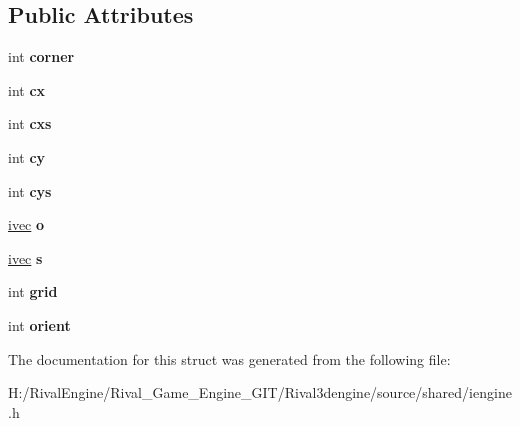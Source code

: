 \subsection*{Public Attributes}
\begin{DoxyCompactItemize}
\item 
\mbox{\label{structselinfo_a85f57916f8cf73dd960665b30b6187b2}} 
int {\bfseries corner}
\item 
\mbox{\label{structselinfo_a4a050e4b02c6c71339578e1061ffe665}} 
int {\bfseries cx}
\item 
\mbox{\label{structselinfo_a4e29ae10c2ed65e0af962b39b99616d9}} 
int {\bfseries cxs}
\item 
\mbox{\label{structselinfo_a9afe089523c9784517ce403b15b9e4d2}} 
int {\bfseries cy}
\item 
\mbox{\label{structselinfo_a70e7f6f5e03f4dde48a627c1607136aa}} 
int {\bfseries cys}
\item 
\mbox{\label{structselinfo_ae8353821d8834bf1fd29564adadc742d}} 
\hyperlink{structivec}{ivec} {\bfseries o}
\item 
\mbox{\label{structselinfo_ae4046419c26164eb9aa5a2643e5bff00}} 
\hyperlink{structivec}{ivec} {\bfseries s}
\item 
\mbox{\label{structselinfo_ac7e357c2f1b3e3baed4761f45d8653eb}} 
int {\bfseries grid}
\item 
\mbox{\label{structselinfo_a25ac5bf8a2bb25a9f96317d8badf2ce7}} 
int {\bfseries orient}
\end{DoxyCompactItemize}


The documentation for this struct was generated from the following file\+:\begin{DoxyCompactItemize}
\item 
H\+:/\+Rival\+Engine/\+Rival\+\_\+\+Game\+\_\+\+Engine\+\_\+\+G\+I\+T/\+Rival3dengine/source/shared/iengine.\+h\end{DoxyCompactItemize}
